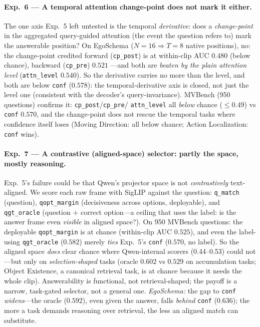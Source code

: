 \documentclass[11pt]{article}
\begin{document}
\paragraph{Exp.~6 --- A temporal attention change-point does not mark it either.} The one axis Exp.~5
left untested is the temporal \emph{derivative}: does a \emph{change-point} in the aggregated
query-guided attention (the event the question refers to) mark the answerable position? On EgoSchema
($N{=}16\Rightarrow T{=}8$ native positions), no: the change-point credited forward
(\texttt{cp\_post}) is at within-clip AUC $0.480$ (below chance), backward (\texttt{cp\_pre}) $0.521$
---and both are \emph{beaten by the plain attention level} (\texttt{attn\_level} $0.540$). So the
derivative carries no more than the level, and both are below \texttt{conf} ($0.578$): the
temporal-derivative axis is closed, not just the level one (consistent with the decoder's
query-invariance). MVBench (950 questions) confirms it: \texttt{cp\_post}/\texttt{cp\_pre}/
\texttt{attn\_level} all \emph{below} chance ($\le0.49$) vs \texttt{conf} $0.570$, and the
change-point does not rescue the temporal tasks where confidence itself loses (Moving Direction:
all below chance; Action Localization: \texttt{conf} wins).

\paragraph{Exp.~7 --- A contrastive (aligned-space) selector: partly the space, mostly reasoning.}
Exp.~5's failure could be that Qwen's projector space is not \emph{contrastively} text-aligned. We
score each raw frame with SigLIP against the question: \texttt{q\_match} (question), \texttt{qopt\_margin}
(decisiveness across options, deployable), and \texttt{qgt\_oracle} (question $+$ correct option---a
ceiling that uses the label: is the answer frame even \emph{visible} in aligned space?). On 950
MVBench questions: the deployable \texttt{qopt\_margin} is at chance (within-clip AUC $0.525$), and
even the label-using \texttt{qgt\_oracle} ($0.582$) merely \emph{ties} Exp.~5's \texttt{conf}
($0.570$, no label). So the aligned space \emph{does} clear chance where Qwen-internal scorers
(0.44--0.53) could not---but only on \emph{selection-shaped} tasks (oracle $0.602$ vs $0.529$ on
accumulation tasks; Object Existence, a canonical retrieval task, is at chance because it needs the
whole clip). Answerability is functional, not retrieval-shaped; the payoff is a narrow, task-gated
selector, not a general one. \emph{EgoSchema:} the gap to \texttt{conf} \emph{widens}---the oracle
($0.592$), even given the answer, falls \emph{behind} \texttt{conf} ($0.636$); the more a task
demands reasoning over retrieval, the less an aligned match can substitute.
\end{document}
